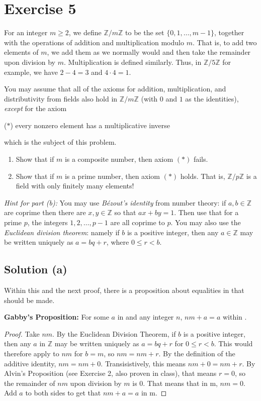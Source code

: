 \documentclass[11pt]{article}
\begin{document}
\pagebreak
\section{Exercise 5}
    For an integer $m \geq 2$, we define $\mathbb{Z}/m\mathbb{Z}$ to be the set $\{0, 1, \dots, m - 1\}$, together with the operations of addition and multiplication modulo $m$. That is, to add two elements of $m$, we add them as we normally would and then take the remainder upon division by $m$. Multiplication is defined similarly. Thus, in $\mathbb{Z}/5\mathbb{Z}$ for example, we have $2 - 4 = 3$ and $4 \cdot 4 = 1$.

    You may assume that all of the axioms for addition, multiplication, and distributivity from fields also hold in $\mathbb{Z}/m\mathbb{Z}$ (with $0$ and $1$ as the identities), \textit{except} for the axiom

    ($\ast$) every nonzero element has a multiplicative inverse

    which is the subject of this problem.
    \begin{enumerate}[label=(\alph*)]
        \item 
        Show that if $m$ is a composite number, then axiom $(\ast)$ fails.

        \item 
        Show that if $m$ is a prime number, then axiom $(\ast)$ holds. That is, $\mathbb{Z}/p\mathbb{Z}$ is a field with only finitely many elements!
    \end{enumerate}
    \textit{Hint for part (b):} You may use \textit{B\'ezout's identity} from number theory: if $a, b \in \mathbb{Z}$ are coprime then there are $x, y \in \mathbb{Z}$ so that $ax + by = 1$. Then use that for a prime $p$, the integers $1, 2, \dots, p - 1$ are all coprime to $p$. You may also use the \textit{Euclidean division theorem}: namely if $b$ is a positive integer, then any $a \in \mathbb{Z}$ may be written uniquely as $a = bq + r$, where $0 \leq r < b$.

    \subsection{Solution (a)}
        Within this and the next proof, there is a proposition about equalities in  that should be made. 

    \textbf{Gabby's Proposition: } For some $a$ in  and any integer $n$, $nm + a = a$ within .
    \begin{proof}
        Take $nm$.
        By the Euclidean Division Theorem, if $b$ is a positive integer, then any $a$ in $\mathbb{Z}$ may be written uniquely as $a = bq + r$ for $0 \leq r < b$.
        This would therefore apply to $nm$ for $b = m$, so $nm = nm + r$.
        By the definition of the additive identity, $nm = nm + 0$.
        Transisistively, this means $nm + 0 = nm + r$.
        By Alvin's Proposition (see Exercise 2, also proven in class), that means $r = 0$, so the remainder of $nm$ upon division by $m$ is $0$.
        That means that in \zz m, $nm = 0$.
        Add $a$ to both sides to get that $nm + a = a$ in \zz m.
    \end{proof}
\end{document}
